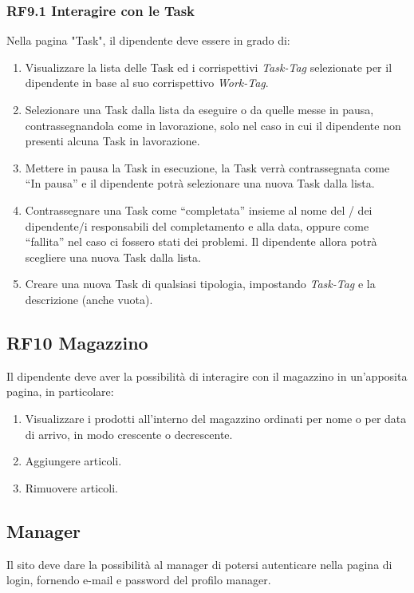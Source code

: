 \documentclass{report}
\begin{document}
\subsubsection*{RF9.1 Interagire con le Task}

Nella pagina "Task", il dipendente deve essere in grado di:

\begin{enumerate}
	\item Visualizzare la lista delle Task ed i corrispettivi \textit{Task-Tag} selezionate per il dipendente in base al suo corrispettivo \textit{Work-Tag}.
	
	\item Selezionare una Task dalla lista da eseguire o da quelle messe in pausa, contrassegnandola come in lavorazione, solo nel caso in cui il dipendente non presenti alcuna Task in lavorazione.
	
	\item Mettere in pausa la Task in esecuzione, la Task verrà contrassegnata come “In pausa” e il dipendente potrà selezionare una nuova Task dalla lista.
	
	\item Contrassegnare una Task come “completata”  insieme al nome del / dei dipendente/i responsabili del completamento e alla data, oppure come “fallita” nel caso ci fossero stati dei problemi. Il dipendente allora potrà scegliere una nuova Task dalla lista.
	
	\item Creare una nuova Task di qualsiasi tipologia, impostando \textit{Task-Tag} e la descrizione (anche vuota).
	
\end{enumerate}

\subsection*{RF10 Magazzino}
Il dipendente deve aver la possibilità di interagire con il magazzino in un'apposita pagina, in particolare:
\begin{enumerate}
	\item Visualizzare i prodotti all'interno del magazzino ordinati per nome o per data di arrivo, in modo crescente o decrescente.
	\item Aggiungere articoli.
	\item Rimuovere articoli.
\end{enumerate}

\subsection{Manager}
Il sito deve dare la possibilità al manager di potersi autenticare nella pagina di login, fornendo e-mail e password del profilo manager.
\end{document}
